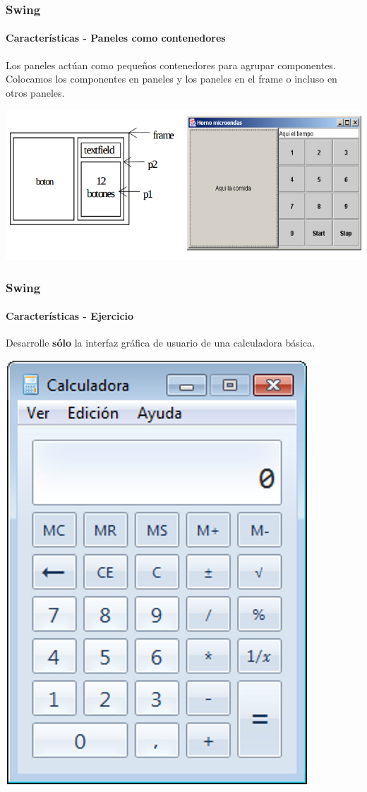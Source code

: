 \documentclass{beamer}
\begin{document}
	\begin{frame}
		\frametitle{Swing}
		\framesubtitle{Caracter\'isticas - Paneles como contenedores}

        Los paneles act\'uan como peque\~nos contenedores para agrupar componentes. Colocamos los componentes en paneles y los paneles en el frame o incluso en otros paneles.

	    \begin{center}
	        	\includegraphics[scale=.37]{images/panel-container.png}
	    \end{center}
	\end{frame}

	\begin{frame}
		\frametitle{Swing}
		\framesubtitle{Caracter\'isticas - Ejercicio}

        Desarrolle \textbf{s\'olo} la interfaz gr\'afica de usuario de una calculadora b\'asica.

	    \begin{center}
	        	\includegraphics[scale=.35]{images/calculadora.png}
	    \end{center}
	\end{frame}
\end{document}

